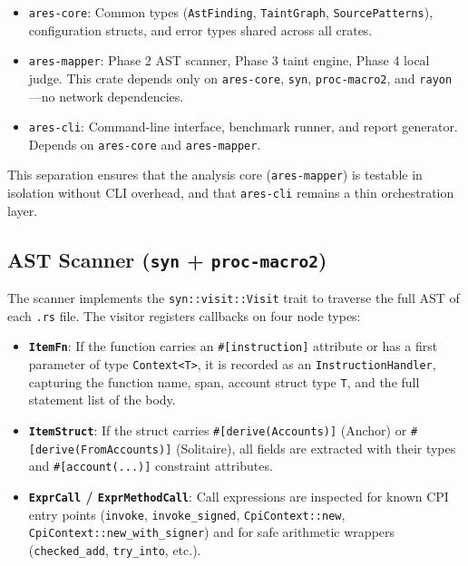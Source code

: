 \documentclass{article}
\begin{document}
\begin{itemize}
  \item \texttt{ares-core}: Common types (\texttt{AstFinding}, \texttt{TaintGraph}, \texttt{SourcePatterns}), configuration structs, and error types shared across all crates.
  \item \texttt{ares-mapper}: Phase 2 AST scanner, Phase 3 taint engine, Phase 4 local judge. This crate depends only on \texttt{ares-core}, \texttt{syn}, \texttt{proc-macro2}, and \texttt{rayon}---no network dependencies.
  \item \texttt{ares-cli}: Command-line interface, benchmark runner, and report generator. Depends on \texttt{ares-core} and \texttt{ares-mapper}.
\end{itemize}

This separation ensures that the analysis core (\texttt{ares-mapper}) is testable in isolation without CLI overhead, and that \texttt{ares-cli} remains a thin orchestration layer.

\subsection{AST Scanner (\texttt{syn} + \texttt{proc-macro2})}

The scanner implements the \texttt{syn::visit::Visit} trait to traverse the full AST of each \texttt{.rs} file. The visitor registers callbacks on four node types:

\begin{itemize}
  \item \textbf{\texttt{ItemFn}}: If the function carries an \texttt{\#[instruction]} attribute or has a first parameter of type \texttt{Context<T>}, it is recorded as an \texttt{InstructionHandler}, capturing the function name, span, account struct type \texttt{T}, and the full statement list of the body.
  \item \textbf{\texttt{ItemStruct}}: If the struct carries \texttt{\#[derive(Accounts)]} (Anchor) or \texttt{\#[derive(FromAccounts)]} (Solitaire), all fields are extracted with their types and \texttt{\#[account(...)]} constraint attributes.
  \item \textbf{\texttt{ExprCall} / \texttt{ExprMethodCall}}: Call expressions are inspected for known CPI entry points (\texttt{invoke}, \texttt{invoke\_signed}, \texttt{CpiContext::new}, \texttt{CpiContext::new\_with\_signer}) and for safe arithmetic wrappers (\texttt{checked\_add}, \texttt{try\_into}, etc.).
\end{itemize}
\end{document}
